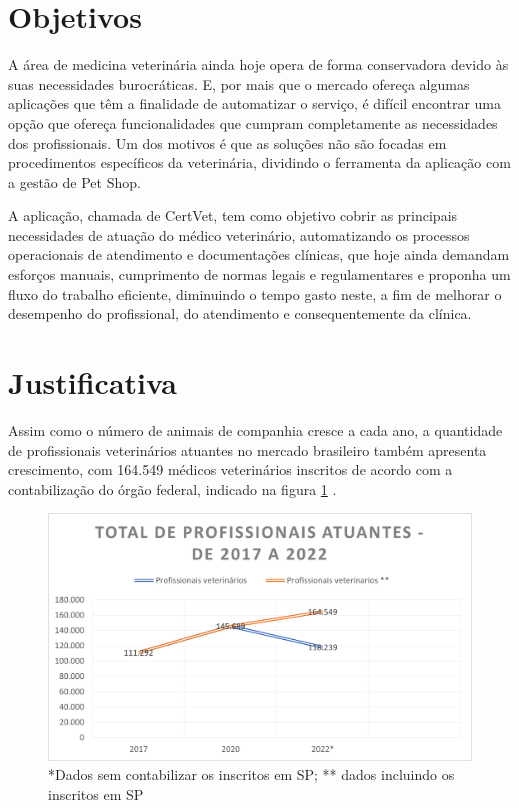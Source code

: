 \documentclass[
    12pt,               %
    openright,          %
    oneside,
    a4paper,            %
    BIBLATEX,           %
    TODO,               %
    english,            %
    brazil              %
    ]{ifsp-spo-inf-ctds}
\begin{document}
    \section{Objetivos}

    A área de medicina veterinária ainda hoje opera de forma conservadora devido às suas necessidades burocráticas. E, por mais que o mercado ofereça algumas aplicações que têm a finalidade de automatizar o serviço, é difícil encontrar uma opção que ofereça funcionalidades que cumpram completamente as necessidades dos profissionais. Um dos motivos é que as soluções não são focadas em procedimentos específicos da veterinária, dividindo o ferramenta da aplicação com a gestão de Pet Shop.
    
    A aplicação, chamada de CertVet, tem como objetivo cobrir as principais necessidades de atuação do médico veterinário, automatizando os processos operacionais de atendimento e documentações clínicas, que hoje ainda demandam esforços manuais, cumprimento de normas legais e regulamentares e proponha um fluxo do trabalho eficiente, diminuindo o tempo gasto neste, a fim de melhorar o desempenho do profissional, do atendimento e consequentemente da clínica.


    \section{Justificativa}

    Assim como o número de animais de companhia cresce a cada ano, a quantidade de profissionais veterinários atuantes no mercado brasileiro também apresenta crescimento, com 164.549 médicos veterinários inscritos de acordo com a contabilização do órgão federal, indicado na figura \ref{fig:grafico vet} \cite{vets_SP, vets2020, vets2022}.
    
    \begin{figure}[H]
        \centering
        \includegraphics{images/grafico_profissionais.png}
        \caption{*Dados sem contabilizar os inscritos em SP; ** dados incluindo os inscritos em SP\cite{vets2020,vets2022} }
        \label{fig:grafico vet}
    \end{figure}
    
\end{document}
